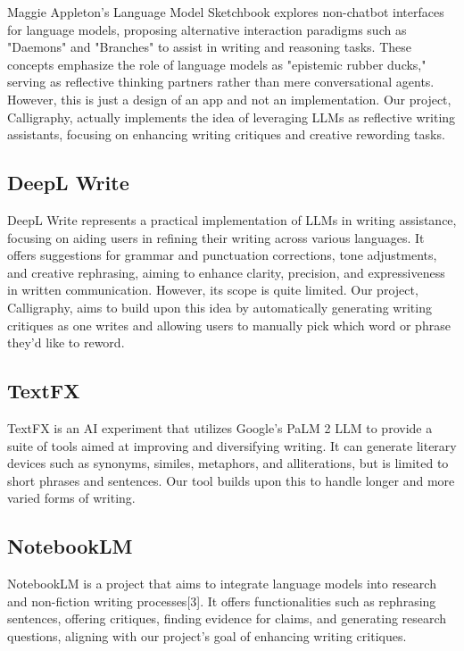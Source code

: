 \documentclass{article}
\begin{document}
Maggie Appleton's Language Model Sketchbook explores non-chatbot interfaces for
language models, proposing alternative interaction paradigms such as "Daemons" and
"Branches" to assist in writing and reasoning tasks. These concepts emphasize the
role of language models as "epistemic rubber ducks," serving as reflective thinking
partners rather than mere conversational agents. However, this is just a design of
an app and not an implementation. Our project, Calligraphy, actually implements
the idea of leveraging LLMs as reflective writing assistants, focusing on enhancing
writing critiques and creative rewording tasks.

\subsection{DeepL Write}

DeepL Write represents a practical implementation of LLMs in writing assistance,
focusing on aiding users in refining their writing across various languages. It
offers suggestions for grammar and punctuation corrections, tone adjustments, and
creative rephrasing, aiming to enhance clarity, precision, and expressiveness in
written communication. However, its scope is quite limited. Our project,
Calligraphy, aims to build upon this idea by automatically generating writing
critiques as one writes and allowing users to manually pick which word or phrase
they'd like to reword.

\subsection{TextFX}

TextFX is an AI experiment that utilizes Google's PaLM 2 LLM to provide a suite of tools aimed at improving and diversifying writing. It can generate literary devices such as synonyms, similes, metaphors, and alliterations, but is limited to short phrases and sentences. Our tool builds upon this to handle longer and more varied forms of writing.

\subsection{NotebookLM}

NotebookLM is a project that aims to integrate language models into research and non-fiction writing processes[3]. It offers functionalities such as rephrasing sentences, offering critiques, finding evidence for claims, and generating research questions, aligning with our project's goal of enhancing writing critiques.
\end{document}
